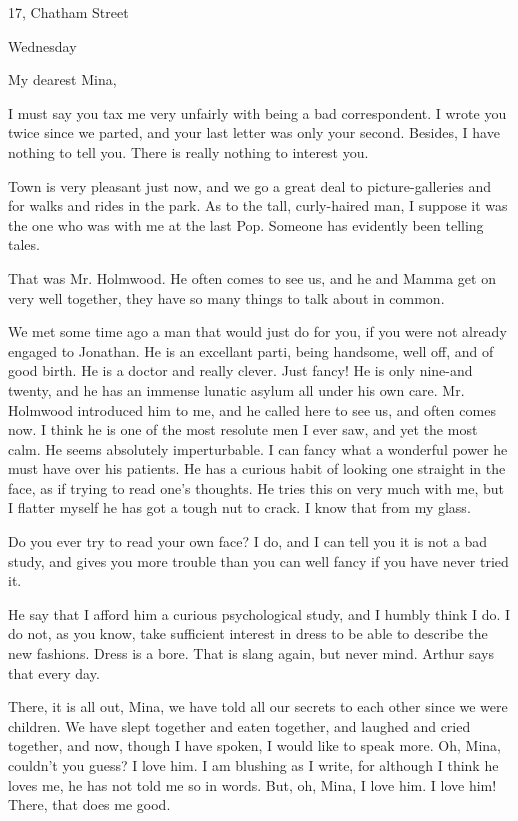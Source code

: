 17, Chatham Street 

Wednesday 

My dearest Mina, 

I must say you tax me very unfairly with being a bad correspondent. I wrote you twice since we parted, and your last letter was only your second. Besides, I have nothing to tell you. There is really nothing to interest you. 

Town is very pleasant just now, and we go a great deal to picture-galleries and for walks and rides in the park. As to the tall, curly-haired man, I suppose it was the one who was with me at the last Pop. Someone has evidently been telling tales. 

That was Mr. Holmwood. He often comes to see us, and he and Mamma get on very well together, they have so many things to talk about in common. 

We met some time ago a man that would just do for you, if you were not already engaged to Jonathan. He is an excellant parti, being handsome, well off, and of good birth. He is a doctor and really clever. Just fancy! He is only nine-and twenty, and he has an immense lunatic asylum all under his own care. Mr. Holmwood introduced him to me, and he called here to see us, and often comes now. I think he is one of the most resolute men I ever saw, and yet the most calm. He seems absolutely imperturbable. I can fancy what a wonderful power he must have over his patients. He has a curious habit of looking one straight in the face, as if trying to read one's thoughts. He tries this on very much with me, but I flatter myself he has got a tough nut to crack. I know that from my glass. 

Do you ever try to read your own face? I do, and I can tell you it is not a bad study, and gives you more trouble than you can well fancy if you have never tried it. 

He say that I afford him a curious psychological study, and I humbly think I do. I do not, as you know, take sufficient interest in dress to be able to describe the new fashions. Dress is a bore. That is slang again, but never mind. Arthur says that every day. 

There, it is all out, Mina, we have told all our secrets to each other since we were children. We have slept together and eaten together, and laughed and cried together, and now, though I have spoken, I would like to speak more. Oh, Mina, couldn't you guess? I love him. I am blushing as I write, for although I think he loves me, he has not told me so in words. But, oh, Mina, I love him. I love him! There, that does me good. 

